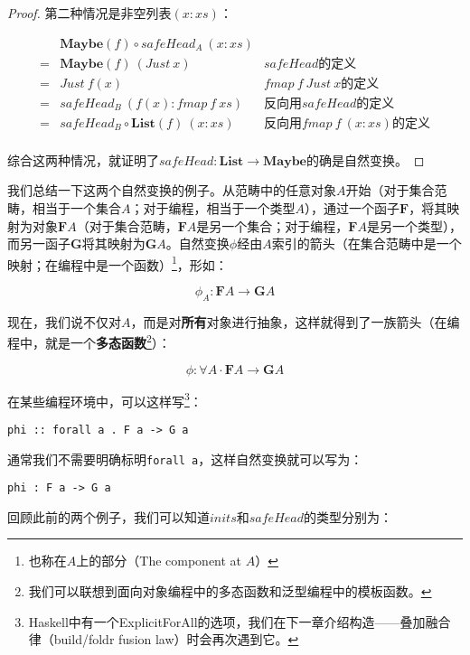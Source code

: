 \documentclass{article}
\begin{document}
\begin{example}
\begin{proof}
第二种情况是非空列表$(x:xs)$：

\[
\begin{array}{cll}
  & \mathbf{Maybe}(f) \circ safeHead_A\ (x:xs) & \\
= & \mathbf{Maybe}(f)\ (Just\ x) & \text{$safeHead$的定义} \\
= & Just\ f(x) & \text{$fmap\ f\ Just\ x$的定义} \\
= & safeHead_B\ (f(x) : fmap\ f\ xs) & \text{反向用$safeHead$的定义} \\
= & safeHead_B \circ \mathbf{List}(f)\ (x:xs) & \text{反向用$fmap\ f\ (x:xs)$的定义} \\
\end{array}
\]

综合这两种情况，就证明了$safeHead : \mathbf{List} \to \mathbf{Maybe}$的确是自然变换。
\end{proof}
\end{example}

我们总结一下这两个自然变换的例子。从范畴中的任意对象$A$开始（对于集合范畴，相当于一个集合$A$；对于编程，相当于一个类型$A$），通过一个函子$\mathbf{F}$，将其映射为对象$\mathbf{F}A$（对于集合范畴，$\mathbf{F}A$是另一个集合；对于编程，$\mathbf{F}A$是另一个类型），而另一函子$\mathbf{G}$将其映射为$\mathbf{G}A$。自然变换$\phi$经由$A$索引的箭头（在集合范畴中是一个映射；在编程中是一个函数）\footnote{也称在$A$上的部分（The component at $A$）}，形如：

\[
\phi_A : \mathbf{F} A \to \mathbf{G} A
\]

现在，我们说不仅对$A$，而是对\textbf{所有}对象进行抽象，这样就得到了一族箭头（在编程中，就是一个\textbf{多态函数}\footnote{我们可以联想到面向对象编程中的多态函数和泛型编程中的模板函数。}）：

\[
\phi : \forall A \cdot \mathbf{F} A \to \mathbf{G} A
\]

在某些编程环境中，可以这样写\footnote{Haskell中有一个ExplicitForAll的选项，我们在下一章介绍构造——叠加融合律（build/foldr fusion law）时会再次遇到它。}：

\lstset{frame=single}
\begin{lstlisting}
phi :: forall a . F a -> G a
\end{lstlisting}

通常我们不需要明确标明\texttt{forall a}，这样自然变换就可以写为：

\begin{lstlisting}
phi : F a -> G a
\end{lstlisting}

回顾此前的两个例子，我们可以知道$inits$和$safeHead$的类型分别为：
\end{document}
